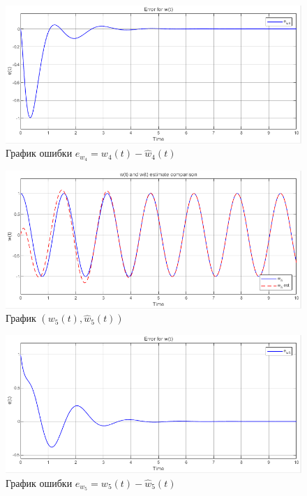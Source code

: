 \documentclass[a4paper, 12pt]{article}
\begin{document}
    \begin{figure}[H]
        \centering
        \includegraphics[scale=0.75]{2task_ew4.png}
        \captionsetup{skip=0pt}
        \caption{График ошибки $e_{w_4}=w_4(t)-\hat{w}_4(t)$}
        \label{fig:2task_ew4}
    \end{figure}
    \begin{figure}[H]
        \centering
        \includegraphics[scale=0.75]{2task_w5.png}
        \captionsetup{skip=0pt}
        \caption{График $(w_5(t),\hat{w}_5(t))$}
        \label{fig:2task_w5}
    \end{figure}
    \begin{figure}[H]
        \centering
        \includegraphics[scale=0.75]{2task_ew5.png}
        \captionsetup{skip=0pt}
        \caption{График ошибки $e_{w_5}=w_5(t)-\hat{w}_5(t)$}
        \label{fig:2task_ew5}
    \end{figure}
\end{document}

